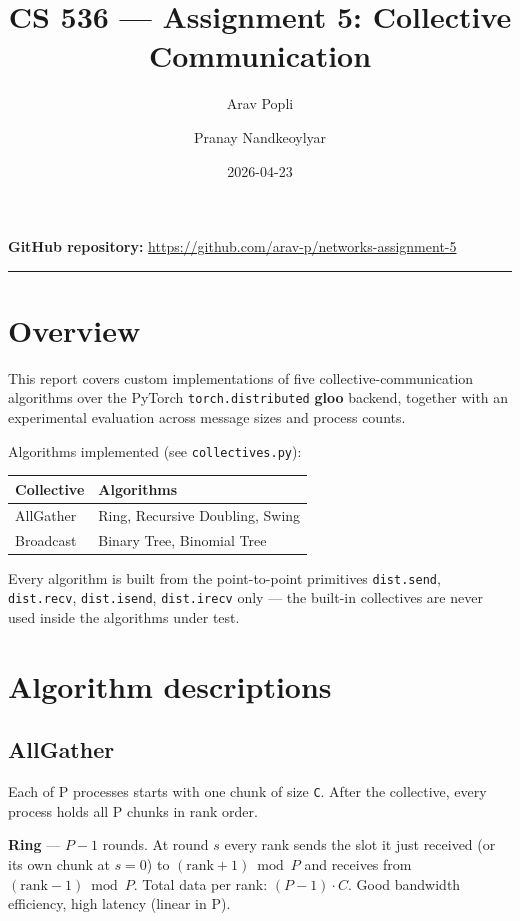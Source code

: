 \documentclass[11pt]{article}
\title{CS 536 --- Assignment 5: Collective Communication}
\author{Arav Popli \and Pranay Nandkeoylyar}
\date{2026-04-23}
\newcommand{\repourl}{https://github.com/arav-p/networks-assignment-5}
\begin{document}
\maketitle

\begin{center}
\textbf{GitHub repository:} \href{\repourl}{\repourl}
\end{center}

\hrule
\vspace{1em}

\section{Overview}

This report covers custom implementations of five collective-communication
algorithms over the PyTorch \texttt{torch.distributed} \textbf{gloo} backend, together
with an experimental evaluation across message sizes and process counts.

Algorithms implemented (see \texttt{collectives.py}):

\begin{center}
\begin{tabular}{ll}
\toprule
\textbf{Collective} & \textbf{Algorithms} \\
\midrule
AllGather & Ring, Recursive Doubling, Swing \\
Broadcast & Binary Tree, Binomial Tree \\
\bottomrule
\end{tabular}
\end{center}

Every algorithm is built from the point-to-point primitives \texttt{dist.send},
\texttt{dist.recv}, \texttt{dist.isend}, \texttt{dist.irecv} only --- the built-in collectives
are never used inside the algorithms under test.

\section{Algorithm descriptions}

\subsection{AllGather}

Each of P processes starts with one chunk of size \texttt{C}. After the
collective, every process holds all P chunks in rank order.

\textbf{Ring} --- $P - 1$ rounds. At round $s$ every rank sends the slot it just
received (or its own chunk at $s = 0$) to $(\text{rank} + 1) \bmod P$ and
receives from $(\text{rank} - 1) \bmod P$. Total data per rank: $(P - 1)\cdot C$.
Good bandwidth efficiency, high latency (linear in P).
\end{document}
